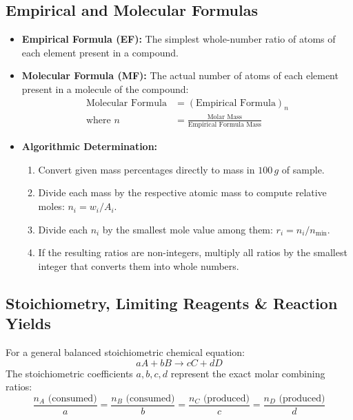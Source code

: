 \documentclass[10pt,twoside,openright]{book}
\begin{document}
\subsection{Empirical and Molecular Formulas}
\begin{conceptbox}
\begin{itemize}
  \item \textbf{Empirical Formula (EF):} The simplest whole-number ratio of atoms of each element present in a compound.
  \item \textbf{Molecular Formula (MF):} The actual number of atoms of each element present in a molecule of the compound:
  \begin{align}
    \text{Molecular Formula} &= (\text{Empirical Formula})_n \\
    \text{where } n &= \frac{\text{Molar Mass}}{\text{Empirical Formula Mass}}
  \end{align}
  \item \textbf{Algorithmic Determination:}
  \begin{enumerate}
    \item Convert given mass percentages directly to mass in $100\,\si{g}$ of sample.
    \item Divide each mass by the respective atomic mass to compute relative moles: $n_i = w_i / A_i$.
    \item Divide each $n_i$ by the smallest mole value among them: $r_i = n_i / n_{\min}$.
    \item If the resulting ratios are non-integers, multiply all ratios by the smallest integer that converts them into whole numbers.
  \end{enumerate}
\end{itemize}
\end{conceptbox}

\subsection{Stoichiometry, Limiting Reagents \& Reaction Yields}
For a general balanced stoichiometric chemical equation:
\begin{equation}
  aA + bB \longrightarrow cC + dD
\end{equation}
The stoichiometric coefficients $a, b, c, d$ represent the exact molar combining ratios:
\begin{equation}
  \frac{n_A\text{ (consumed)}}{a} = \frac{n_B\text{ (consumed)}}{b} = \frac{n_C\text{ (produced)}}{c} = \frac{n_D\text{ (produced)}}{d}
\end{equation}
\end{document}
